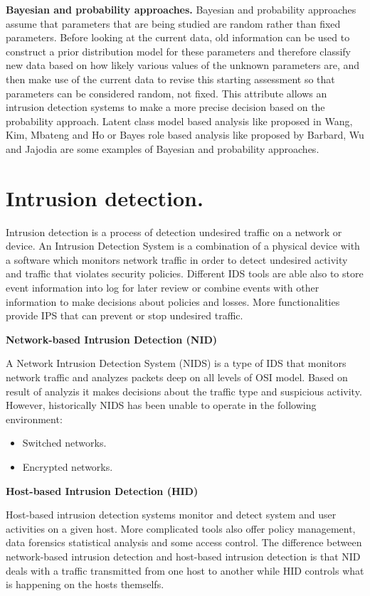 \documentclass[thesis=M,english]{FITthesis}[2011/07/15]
\begin{document}
\textbf{Bayesian and probability approaches.}
Bayesian and probability approaches assume that parameters that are being studied are random rather than fixed parameters. Before looking at the current data, old information can be used to construct a prior distribution model for these parameters and therefore classify new data based on how likely various values of the unknown parameters are, and then make use of the current data to revise this starting assessment so that parameters can be considered random, not fixed. This attribute allows an intrusion detection systems to make a more precise decision based on the probability approach. Latent class model based analysis like proposed in Wang, Kim, Mbateng and Ho or Bayes role based analysis like proposed by Barbard, Wu and Jajodia are some examples of Bayesian and probability approaches.

\section{Intrusion detection.}
Intrusion detection is a process of detection undesired traffic on a network or device. An Intrusion Detection System is a combination of a physical device with a software which monitors network traffic in order to detect undesired activity and traffic that violates security policies. Different IDS tools are able also to store event information into log for later review or combine events with other information to make decisions about policies and losses. More functionalities provide IPS that can prevent or stop undesired traffic.

\textbf{Network-based Intrusion Detection (NID)}

A Network Intrusion Detection System (NIDS) is a type of IDS that monitors network traffic and analyzes packets deep on all levels of OSI model. Based on result of analyzis it makes decisions about the traffic type and suspicious activity. However, historically NIDS has been unable to operate in the following environment:
\begin{itemize}
\item Switched networks.
\item Encrypted networks.
\end{itemize}

\textbf{Host-based Intrusion Detection (HID)}

Host-based intrusion detection systems monitor and detect system and user activities on a given host. More complicated tools also offer policy management, data forensics statistical analysis and some access control. The difference between network-based intrusion detection and host-based intrusion detection is that NID deals with a traffic transmitted from one host to another while HID controls what is happening on the hosts themselfs.
\end{document}
